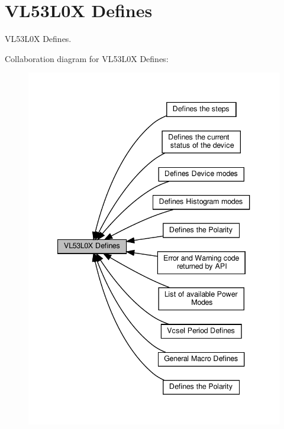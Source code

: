 \hypertarget{group__VL53L0X__globaldefine__group}{}\section{V\+L53\+L0X Defines}
\label{group__VL53L0X__globaldefine__group}


V\+L53\+L0X Defines.  


Collaboration diagram for V\+L53\+L0X Defines\+:\nopagebreak
\begin{figure}[H]
\begin{center}
\leavevmode
\includegraphics[width=340pt]{group__VL53L0X__globaldefine__group}
\end{center}
\end{figure}

